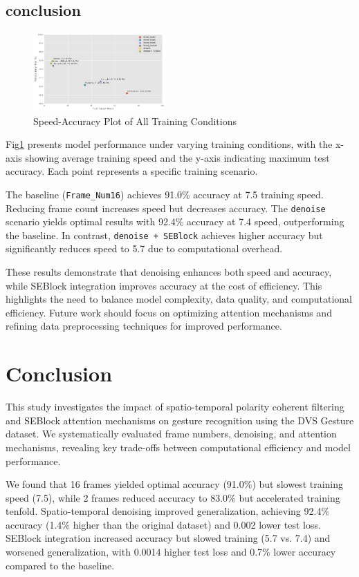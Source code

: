 \documentclass[conference]{IEEEtran}
\begin{document}
\subsection{conclusion}
\begin{figure}[htbp]
    \centering
    \includegraphics[width=0.45\textwidth]{figure/acc_speed.png}
    \caption{Speed-Accuracy Plot of All Training Conditions}
    \label{fig:acc_speed_all}
\end{figure}
Fig\ref{fig:acc_speed_all} presents model performance under varying training conditions, with the x-axis showing average training speed and the y-axis indicating maximum test accuracy. Each point represents a specific training scenario.

The baseline (\texttt{Frame\_Num16}) achieves 91.0\% accuracy at 7.5 training speed. Reducing frame count increases speed but decreases accuracy. The \texttt{denoise} scenario yields optimal results with 92.4\% accuracy at 7.4 speed, outperforming the baseline. In contrast, \texttt{denoise + SEBlock} achieves higher accuracy but significantly reduces speed to 5.7 due to computational overhead.

These results demonstrate that denoising enhances both speed and accuracy, while SEBlock integration improves accuracy at the cost of efficiency. This highlights the need to balance model complexity, data quality, and computational efficiency. Future work should focus on optimizing attention mechanisms and refining data preprocessing techniques for improved performance.

\section{Conclusion}
This study investigates the impact of spatio-temporal polarity coherent filtering and SEBlock attention mechanisms on gesture recognition using the DVS Gesture dataset. We systematically evaluated frame numbers, denoising, and attention mechanisms, revealing key trade-offs between computational efficiency and model performance.

We found that 16 frames yielded optimal accuracy (91.0\%) but slowest training speed (7.5), while 2 frames reduced accuracy to 83.0\% but accelerated training tenfold. Spatio-temporal denoising improved generalization, achieving 92.4\% accuracy (1.4\% higher than the original dataset) and 0.002 lower test loss. SEBlock integration increased accuracy but slowed training (5.7 vs. 7.4) and worsened generalization, with 0.0014 higher test loss and 0.7\% lower accuracy compared to the baseline.
\end{document}
